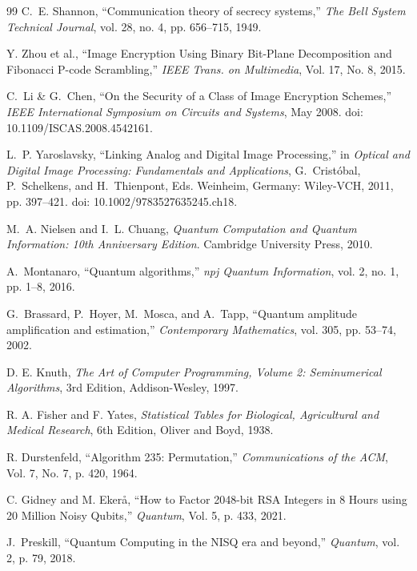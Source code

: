 \documentclass[12pt,fleqn]{article}
\begin{document}
\begin{thebibliography}{99}
C.~E. Shannon, ``Communication theory of secrecy systems,'' \textit{The Bell System Technical Journal}, vol. 28, no. 4, pp. 656--715, 1949.

Y. Zhou et al., ``Image Encryption Using Binary Bit-Plane Decomposition and Fibonacci P-code Scrambling,'' \textit{IEEE Trans. on Multimedia}, Vol. 17, No. 8, 2015.

C.~Li & G.~Chen, ``On the Security of a Class of Image Encryption Schemes,'' \emph{IEEE International Symposium on Circuits and Systems}, May 2008. doi: 10.1109/ISCAS.2008.4542161.

L.~P. Yaroslavsky, ``Linking Analog and Digital Image Processing,'' in \emph{Optical and Digital Image Processing: Fundamentals and Applications}, G.~Crist{\'o}bal, P.~Schelkens, and H.~Thienpont, Eds. Weinheim, Germany: Wiley-VCH, 2011, pp. 397--421. doi: 10.1002/9783527635245.ch18.

M.~A. Nielsen and I.~L. Chuang, \textit{Quantum Computation and Quantum Information: 10th Anniversary Edition}. Cambridge University Press, 2010.

A.~Montanaro, ``Quantum algorithms,'' \textit{npj Quantum Information}, vol. 2, no. 1, pp. 1--8, 2016.

G.~Brassard, P.~Hoyer, M.~Mosca, and A.~Tapp, ``Quantum amplitude amplification and estimation,'' \textit{Contemporary Mathematics}, vol. 305, pp. 53--74, 2002.

D. E. Knuth, \textit{The Art of Computer Programming, Volume 2: Seminumerical Algorithms}, 3rd Edition, Addison-Wesley, 1997.

R. A. Fisher and F. Yates, \textit{Statistical Tables for Biological, Agricultural and Medical Research}, 6th Edition, Oliver and Boyd, 1938.

R. Durstenfeld, ``Algorithm 235: Permutation,'' \textit{Communications of the ACM}, Vol. 7, No. 7, p. 420, 1964.

C. Gidney and M. Ekerå, ``How to Factor 2048-bit RSA Integers in 8 Hours using 20 Million Noisy Qubits,'' \textit{Quantum}, Vol. 5, p. 433, 2021.

J.~Preskill, ``Quantum Computing in the NISQ era and beyond,'' \textit{Quantum}, vol. 2, p. 79, 2018.


\end{thebibliography}
\end{document}
